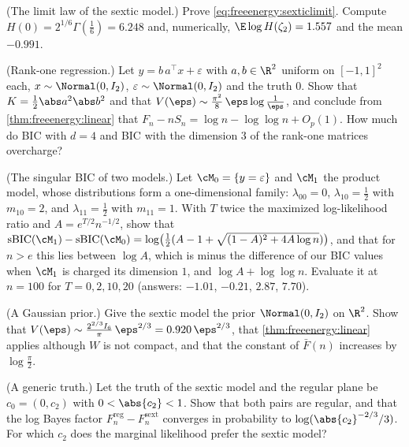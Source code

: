 \begin{refsection}
\begin{exercises}
\item \byhand\hard (The limit law of the sextic model.) Prove \eqref{eq:freeenergy:sexticlimit}.  Compute $H(0)=2^{1/6}\Gamma(\frac16)=6.248$ and, numerically, $\E\log H(\zeta_2)=1.557$ and the mean $-0.991$.\label{ex:freeenergy:limit}

\item \byhand (Rank-one regression.) Let $y=b\,a^\top x+\varepsilon$ with $a,b\in\R^2$ uniform on $[-1,1]^2$ each, $x\sim\Normal(0,I_2)$, $\varepsilon\sim\Normal(0,I_2)$ and the truth $0$. Show that $K=\frac12\abs a^2\abs b^2$ and that $V(\eps)\sim\frac{\pi^2}8\,\eps\log\frac1\eps$, and conclude from \cref{thm:freeenergy:linear} that $F_n-nS_n=\log n-\log\log n+O_p(1)$. How much do BIC with $d=4$ and BIC with the dimension $3$ of the rank-one matrices overcharge? \label{ex:freeenergy:rankone}

\item \byhand (The singular BIC of two models.) Let $\cM_0=\{y=\varepsilon\}$ and $\cM_1$ the product model, whose distributions form a one-dimensional family: $\lambda_{00}=0$, $\lambda_{10}=\frac12$ with $m_{10}=2$, and $\lambda_{11}=\frac12$ with $m_{11}=1$. With $T$ twice the maximized log-likelihood ratio and $A=e^{T/2}n^{-1/2}$, show that $\mathrm{sBIC}(\cM_1)-\mathrm{sBIC}(\cM_0)=\log\bigl(\frac12(A-1+\sqrt{(1-A)^2+4A\log n})\bigr)$, and that for $n>e$ this lies between $\log A$, which is minus the difference of our BIC values when $\cM_1$ is charged its dimension $1$, and $\log A+\log\log n$. Evaluate it at $n=100$ for $T=0,2,10,20$ (answers: $-1.01$, $-0.21$, $2.87$, $7.70$).\label{ex:freeenergy:sbichand}

\item \variation (A Gaussian prior.) Give the sextic model the prior $\Normal(0,I_2)$ on $\R^2$. Show that $V(\eps)\sim\frac{2^{2/3}I_6}\pi\,\eps^{2/3}=0.920\,\eps^{2/3}$, that \cref{thm:freeenergy:linear} applies although $W$ is not compact, and that the constant of $\bar F(n)$ increases by $\log\frac\pi2$.\label{ex:freeenergy:gaussian}

\item \variation (A generic truth.) Let the truth of the sextic model and the regular plane be $c_0=(0,c_2)$ with $0<\abs{c_2}<1$. Show that both pairs are regular, and that the log Bayes factor $F_n^{\mathrm{reg}}-F_n^{\mathrm{sext}}$ converges in probability to $\log(\abs{c_2}^{-2/3}/3)$. For which $c_2$ does the marginal likelihood prefer the sextic model?\label{ex:freeenergy:generic}


\end{exercises}
\end{refsection}
